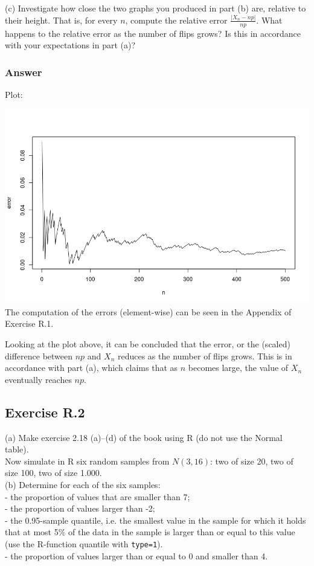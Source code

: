 \documentclass[12pt]{article}
\begin{document}
(c) Investigate how close the two graphs you produced in part (b) are, relative to their height. That is, for every $n$, compute the relative error $\frac{|X_{n} - np|}{np}$. What happens to the relative error as the number of flips grows? Is this in accordance with your expectations in part (a)?
\subsubsection*{Answer}
Plot:

\includegraphics[width=\textwidth]{Ex1Plot2}
The computation of the errors (element-wise) can be seen in the Appendix of Exercise R.1.

Looking at the plot above, it can be concluded that the error, or the (scaled) difference between $np$ and $X_{n}$ reduces as the number of flips grows. This is in accordance with part (a), which claims that as $n$ becomes large, the value of $X_{n}$ eventually reaches $np$.

\subsection*{Exercise R.2}
(a) Make exercise 2.18 (a)–(d) of the book using R (do not use the Normal table). \\Now simulate in R six random samples from $N(3, 16)$: two of size 20, two of size 100, two of size 1.000.\\
(b) Determine for each of the six samples:\\
- the proportion of values that are smaller than 7;\\
- the proportion of values larger than -2;\\
- the 0.95-sample quantile, i.e. the smallest value in the sample for which it holds that at most 5\% of the data in the sample is larger than or equal to this value (use the R-function quantile with \texttt{type=1}).\\
- the proportion of values larger than or equal to 0 and smaller than 4.
\end{document}
